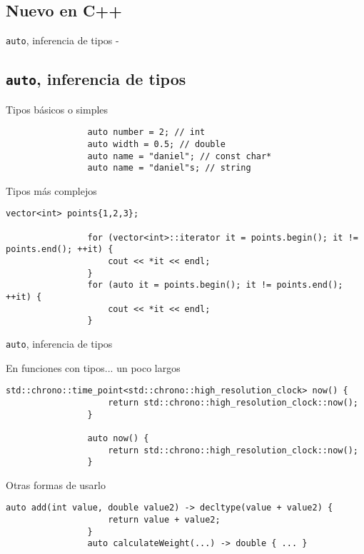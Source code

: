 \documentclass{beamer}
\newcommand{\normalSizeItem}[1] {
  \normalsize{\item #1}
}
\newcommand{\newFrameWithoutIndex}[1]{
	\begin{frame}
		#1
		\thispagestyle{empty}
	\end{frame}
}
\newcommand{\newSectionWithoutIndex}[1]{
	\newFrameWithoutIndex{\section{#1}}
}
\newcommand{\smallCite}[1]{
	\begin{small}
		\cite{#1}	
	\end{small}
}
\begin{document}
		\newSectionWithoutIndex{Nuevo en C++}	
		
		\begin{frame}[fragile]{\texttt{auto}, inferencia de tipos -\smallCite{cppReference}}\subsection{\texttt{auto}, inferencia de tipos}	
			\begin{itemize}
			
				\normalSizeItem{Tipos básicos o simples}
				\begin{lstlisting}
				auto number = 2; // int
				auto width = 0.5; // double
				auto name = "daniel"; // const char*
				auto name = "daniel"s; // string
				\end{lstlisting}
				
				\normalSizeItem{Tipos más complejos}
				\begin{lstlisting}[basicstyle={\tiny\ttfamily}]
				vector<int> points{1,2,3};
				
				for (vector<int>::iterator it = points.begin(); it != points.end(); ++it) {
					cout << *it << endl;
				}
				for (auto it = points.begin(); it != points.end(); ++it) {
					cout << *it << endl;
				}
				\end{lstlisting}
				
			\end{itemize}
		\end{frame}
		
		\begin{frame}[fragile]{\texttt{auto}, inferencia de tipos}	
			\begin{itemize}
			
				\normalSizeItem{En funciones con tipos... un poco largos}
				\begin{lstlisting}[basicstyle={\tiny\ttfamily}]
				std::chrono::time_point<std::chrono::high_resolution_clock> now() {
					return std::chrono::high_resolution_clock::now();
				}
				
				auto now() {
					return std::chrono::high_resolution_clock::now();
				}
				\end{lstlisting}
								
				\normalSizeItem { Otras formas de usarlo }
				\begin{lstlisting}[basicstyle={\tiny\ttfamily}]
				auto add(int value, double value2) -> decltype(value + value2) {
					return value + value2;
				}
				auto calculateWeight(...) -> double { ... }
				\end{lstlisting}
				
			\end{itemize}
		\end{frame}
		
\end{document}
